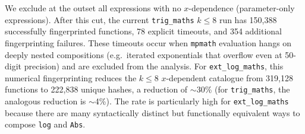\documentclass[preprint,12pt,authoryear]{elsarticle}
\newcommand{\hd}[1]{{\color{red}\textbf{[HD: #1]}}}
\begin{document}
We exclude at the outset all expressions with no $x$-dependence (parameter-only expressions). After this cut, the current \texttt{trig\_maths} $k\leq 8$ run has 150{,}388 successfully fingerprinted functions, 78 explicit timeouts, and 354 additional fingerprinting failures.
These timeouts occur when \texttt{mpmath} evaluation hangs on deeply nested compositions (e.g.\ iterated exponentials that overflow even at 50-digit precision) and are excluded from the analysis.
For \texttt{ext\_log\_maths}, this numerical fingerprinting reduces the $k \leq 8$ $x$-dependent catalogue from 319{,}128 functions to 222{,}838 unique hashes, a reduction of $\sim$30\% (for \texttt{trig\_maths}, the analogous reduction is $\sim$4\%). The rate is particularly high for \texttt{ext\_log\_maths} because there are many syntactically distinct but functionally equivalent ways to compose \texttt{log} and \texttt{Abs}.
\end{document}
